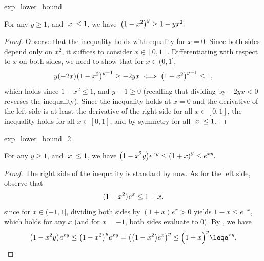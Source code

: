 \begin{fragment}{exp_lower_bound}
    \begin{lemma}
        For any $y \geq 1$, and $\left| {x} \right| \leq 1$, we have
        \begin{math}
            \,\pth[]{ 1-x^2}^y \geq 1 - yx^2.
        \end{math}
    \end{lemma}
\end{fragment}
\begin{proof}
    Observe that the inequality holds with equality for $x=0$.
    Since both sides depend only on $x^2$, it suffices to consider $x \in [0, 1]$.
    Differentiating with respect to $x$ on both sides, we need to show that
    for $x \in (0, 1]$,
    \begin{equation*}
        y(-2x)\pth{1-x^2}^{y-1} \geq -2yx%
        \iff%
        \pth[]{1-x^2}^{y-1} \leq 1,        
    \end{equation*}
    which holds since $1-x^2 \leq 1$, and $y-1 \geq 0$ (recalling that dividing by $-2yx < 0$ reverses the inequality).
    Since the inequality holds at $x=0$ and the derivative of the left side is at least the derivative of the right side for all $x \in [0, 1]$,
    the inequality holds for all $x \in [0, 1]$, and by symmetry for all $\left| {x} \right| \leq 1$.
\end{proof}

\begin{fragment}{exp_lower_bound_2}
    \begin{lemma}
        For any $y \geq 1$, and $\left| {x} \right| \leq 1$, we have
        \begin{math}
            \displaystyle \pth[]{1-x^2y}e^{x y} \leq \pth[]{1+x}^{y}
            \leq e^{x y}.
        \end{math}        
    \end{lemma}
\end{fragment}

\begin{proof}
    The right side of the inequality is standard by now. As for the
    left side, observe that
    \begin{equation*}
        (1-x^2)\hspace{0.6pt} e^x \leq 1+x,        
    \end{equation*}
    since for $x \in (-1, 1]$, dividing both sides by $(1+x)e^x > 0$ yields $1-x \leq e^{-x}$,
    which holds for any $x$ (and for $x = -1$, both sides evaluate to $0$).
    By , we have
    \begin{equation*}
        \pth{1-x^2y}e^{x y}%
        \leq%
        \pth[]{1-x^2}^y e^{xy}%
        =%
        \pth[]{\pth[]{1-x^2} e^{x} }^y%
        \leq%
        \pth[]{\Bigl. 1+x}^{y}%
        \leq%
        e^{x y}.        
    \end{equation*}
\end{proof}


